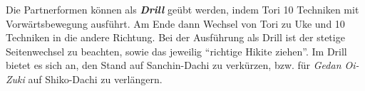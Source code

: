 \begin{tcolorbox}[colframe=GKD,colback=white,coltitle=white,title=Kihon Ippon Kumite\indent {\scriptsize mit Anregungen von Alfred Heubeck - Sh\={o}t\={o}kan Karate-D\={o} Hausheim - Kihon-Ippon-Kumite 1-3}]
\begin{center}
\begin{minipage}[t]{\textwidth-2\tabcolsep}
			{\footnotesize Die Partnerformen können als \textbf{\textit{Drill}} geübt werden, indem Tori 10 Techniken mit Vorwärtsbewegung ausführt. Am Ende dann Wechsel von Tori zu Uke und 10 Techniken in die andere Richtung. Bei der Ausführung als Drill ist der stetige Seitenwechsel zu beachten, sowie das jeweilig \textquotedblleft richtige Hikite ziehen\textquotedblright. Im Drill bietet es sich an, den Stand auf Sanchin-Dachi zu verkürzen, bzw. für \textit{Gedan Oi-Zuki} auf Shiko-Dachi zu verlängern.}
		\end{minipage}
		\end{center}\null\vfill\null
\end{tcolorbox}